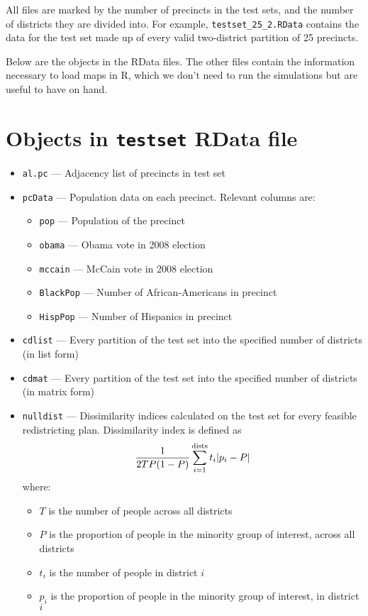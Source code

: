 \documentclass[12pt]{article}
\begin{document}
All files are marked by the number of precincts in the test sets, and the number of districts they are divided into. For example, {\tt testset\_25\_2.RData} contains the data for the test set made up of every valid two-district partition of 25 precincts. 

Below are the objects in the RData files. The other files contain the information necessary to load maps in R, which we don't need to run the simulations but are useful to have on hand. 
\section{Objects in {\tt testset} RData file}

\begin{itemize}
\item {\tt al.pc} --- Adjacency list of precincts in test set
\item {\tt pcData} --- Population data on each precinct. Relevant columns are:
	\begin{itemize}
	\item {\tt pop} --- Population of the precinct
	\item {\tt obama} --- Obama vote in 2008 election
	\item {\tt mccain} --- McCain vote in 2008 election
	\item {\tt BlackPop} --- Number of African-Americans in precinct
	\item {\tt HispPop} --- Number of Hispanics in precinct
	\end{itemize}
\item {\tt cdlist} --- Every partition of the test set into the specified number of districts (in list form)
\item {\tt cdmat} --- Every partition of the test set into the specified number of districts (in matrix form)
\item {\tt nulldist} --- Dissimilarity indices calculated on the test set for every feasible redistricting plan. Dissimilarity index is defined as $$\frac{1}{2TP(1 - P)}\sum_{i = 1}^{{\rm dists}}t_i|p_i - P|$$
where:
	\begin{itemize}
	\item $T$ is the number of people across all districts
	\item $P$ is the proportion of people in the minority group of interest, across all districts
	\item $t_i$ is the number of people in district $i$
	\item $p_i$ is the proportion of people in the minority group of interest, in district $i$

\end{itemize}
\end{itemize}
\end{document}
